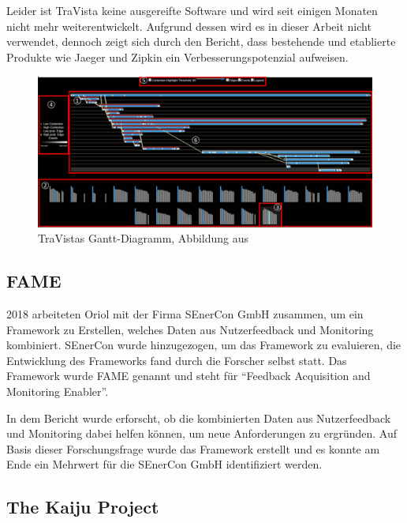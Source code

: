 Leider ist TraVista keine ausgereifte Software und wird seit einigen Monaten nicht mehr weiterentwickelt\footnotemark{}. Aufgrund dessen wird es in dieser Arbeit nicht verwendet, dennoch zeigt sich durch den Bericht, dass bestehende und etablierte Produkte wie Jaeger und Zipkin ein Verbesserungspotenzial aufweisen.


\begin{figure}[H]
	\centering
	\includegraphics[width=0.815\linewidth]{img/03_methoden/travista_extended-gantt.png}
	\caption{TraVistas Gantt-Diagramm, Abbildung aus \cite{TraVistaPaper}}
	\label{fig:travista_extended-gantt}
\end{figure}

\subsection{FAME}

2018 arbeiteten Oriol \etal \cite{FamePaper} mit der Firma SEnerCon GmbH zusammen, um ein Framework zu Erstellen, welches Daten aus Nutzerfeedback und Monitoring kombiniert. SEnerCon wurde hinzugezogen, um das Framework zu evaluieren, die Entwicklung des Frameworks fand durch die Forscher selbst statt. Das Framework wurde FAME\footnotemark{} genannt und steht für \enquote{Feedback Acquisition and Monitoring Enabler}.


In dem Bericht wurde erforscht, ob die kombinierten Daten aus Nutzerfeedback und Monitoring dabei helfen können, um neue Anforderungen zu ergründen. Auf Basis dieser Forschungsfrage wurde das Framework erstellt und es konnte am Ende ein Mehrwert für die SEnerCon GmbH identifiziert werden.

\subsection{The Kaiju Project}

